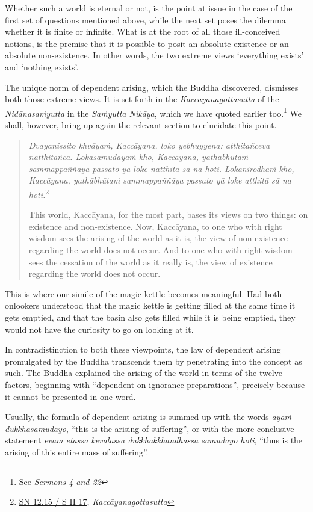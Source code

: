 Whether such a world is eternal or not, is the point at issue in the case of the first set of questions mentioned above, while the next set poses the dilemma whether it is finite or infinite. What is at the root of all those ill-conceived notions, is the premise that it is possible to posit an absolute existence or an absolute non-existence. In other words, the two extreme views `everything exists' and `nothing exists'.

The unique norm of dependent arising, which the Buddha discovered, dismisses both those extreme views. It is set forth in the \emph{Kaccāyanagottasutta} of the \emph{Nidānasaṁyutta} in the \emph{Saṁyutta Nikāya}, which we have quoted earlier too.\footnote{See \emph{Sermons 4 and 22}} We shall, however, bring up again the relevant section to elucidate this point.

\begin{quote}
\emph{Dvayanissito khvāyaṁ, Kaccāyana, loko yebhuyyena: atthitañceva natthitañca. Lokasamudayaṁ kho, Kaccāyana, yathābhūtaṁ sammappaññāya passato yā loke natthitā sā na hoti. Lokanirodhaṁ kho, Kaccāyana, yathābhūtaṁ sammappaññāya passato yā loke atthitā sā na hoti.}\footnote{\href{https://suttacentral.net/sn12.15/pli/ms}{SN 12.15 / S II 17}, \emph{Kaccāyanagottasutta}}

This world, Kaccāyana, for the most part, bases its views on two things: on existence and non-existence. Now, Kaccāyana, to one who with right wisdom sees the arising of the world as it is, the view of non-existence regarding the world does not occur. And to one who with right wisdom sees the cessation of the world as it really is, the view of existence regarding the world does not occur.
\end{quote}

This is where our simile of the magic kettle becomes meaningful. Had both onlookers understood that the magic kettle is getting filled at the same time it gets emptied, and that the basin also gets filled while it is being emptied, they would not have the curiosity to go on looking at it.

In contradistinction to both these viewpoints, the law of dependent arising promulgated by the Buddha transcends them by penetrating into the concept as such. The Buddha explained the arising of the world in terms of the twelve factors, beginning with ``dependent on ignorance preparations'', precisely because it cannot be presented in one word.

Usually, the formula of dependent arising is summed up with the words \emph{ayaṁ dukkhasamudayo}, ``this is the arising of suffering'', or with the more conclusive statement \emph{evam etassa kevalassa dukkhakkhandhassa samudayo hoti}, ``thus is the arising of this entire mass of suffering''.


